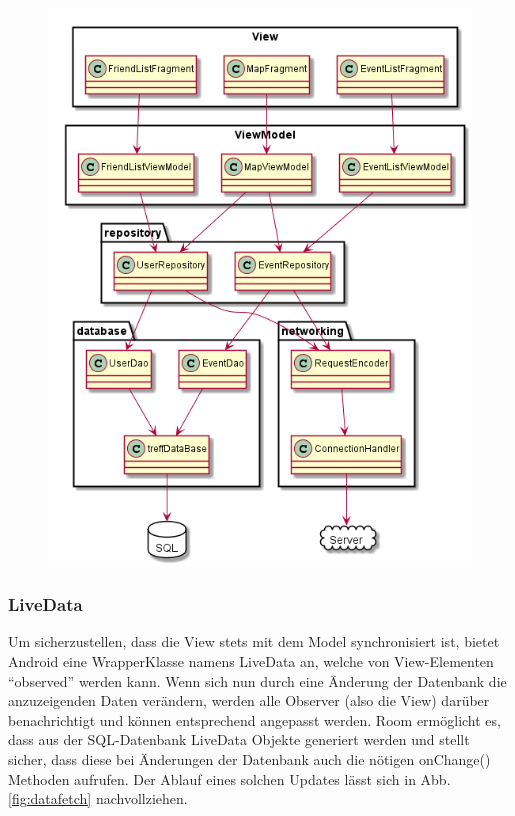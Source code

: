 \documentclass[parskip=full,11pt]{scrartcl}
\begin{document}
\begin{figure}
    \centering
    \includegraphics[width = \columnwidth / 3 * 2]{database.png}
\end{figure}

\subsubsection{LiveData}
Um sicherzustellen, dass die View stets mit dem Model synchronisiert ist,
bietet Android eine WrapperKlasse namens LiveData an, welche von View-Elementen
\enquote{observed} werden kann. Wenn sich nun durch eine Änderung der Datenbank
die anzuzeigenden Daten verändern, werden alle Observer (also die View) darüber
benachrichtigt und können entsprechend angepasst werden.
Room ermöglicht es, dass aus der SQL-Datenbank LiveData Objekte generiert
werden und stellt sicher, dass diese bei Änderungen der Datenbank auch die
nötigen onChange() Methoden aufrufen. Der Ablauf eines solchen Updates lässt
sich in Abb.\ref{fig:datafetch} nachvollziehen.
\end{document}
